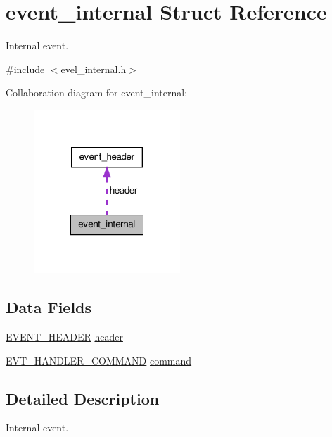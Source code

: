 \hypertarget{structevent__internal}{}\section{event\+\_\+internal Struct Reference}
\label{structevent__internal}


Internal event.  




{\ttfamily \#include $<$evel\+\_\+internal.\+h$>$}



Collaboration diagram for event\+\_\+internal\+:
\nopagebreak
\begin{figure}[H]
\begin{center}
\leavevmode
\includegraphics[width=156pt]{structevent__internal__coll__graph}
\end{center}
\end{figure}
\subsection*{Data Fields}
\begin{DoxyCompactItemize}
\item 
\hyperlink{evel_8h_aa0ea94c675729365ea7825c4fc7e06d8}{E\+V\+E\+N\+T\+\_\+\+H\+E\+A\+D\+E\+R} \hyperlink{structevent__internal_a9bc97bfd3fc7deffd3df855e7e814645}{header}
\item 
\hyperlink{evel__internal_8h_a54a85a3e4ac8075dd263aa69a7b32ba9}{E\+V\+T\+\_\+\+H\+A\+N\+D\+L\+E\+R\+\_\+\+C\+O\+M\+M\+A\+N\+D} \hyperlink{structevent__internal_a7aabad85d349fa4a2d8cefe380fca9de}{command}
\end{DoxyCompactItemize}


\subsection{Detailed Description}
Internal event. 

